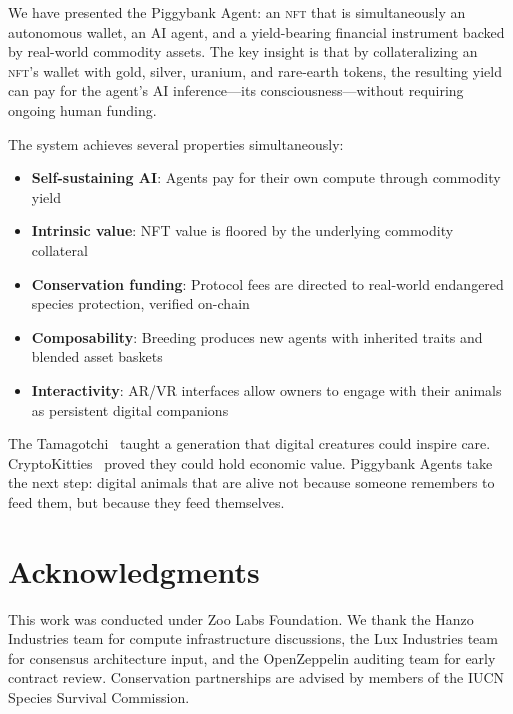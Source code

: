 \documentclass[11pt,letterpaper]{article}
\newcommand{\NFT}{\textsc{nft}}
\begin{document}
We have presented the Piggybank Agent: an \NFT{} that is simultaneously an autonomous wallet, an AI agent, and a yield-bearing financial instrument backed by real-world commodity assets. The key insight is that by collateralizing an \NFT{}'s wallet with gold, silver, uranium, and rare-earth tokens, the resulting yield can pay for the agent's AI inference---its consciousness---without requiring ongoing human funding.

The system achieves several properties simultaneously:

\begin{itemize}
    \item \textbf{Self-sustaining AI}: Agents pay for their own compute through commodity yield
    \item \textbf{Intrinsic value}: NFT value is floored by the underlying commodity collateral
    \item \textbf{Conservation funding}: Protocol fees are directed to real-world endangered species protection, verified on-chain
    \item \textbf{Composability}: Breeding produces new agents with inherited traits and blended asset baskets
    \item \textbf{Interactivity}: AR/VR interfaces allow owners to engage with their animals as persistent digital companions
\end{itemize}

The Tamagotchi~\cite{tamagotchi} taught a generation that digital creatures could inspire care. CryptoKitties~\cite{cryptokitties} proved they could hold economic value. Piggybank Agents take the next step: digital animals that are alive not because someone remembers to feed them, but because they feed themselves.

\section*{Acknowledgments}

This work was conducted under Zoo Labs Foundation. We thank the Hanzo Industries team for compute infrastructure discussions, the Lux Industries team for consensus architecture input, and the OpenZeppelin auditing team for early contract review. Conservation partnerships are advised by members of the IUCN Species Survival Commission.
\end{document}
